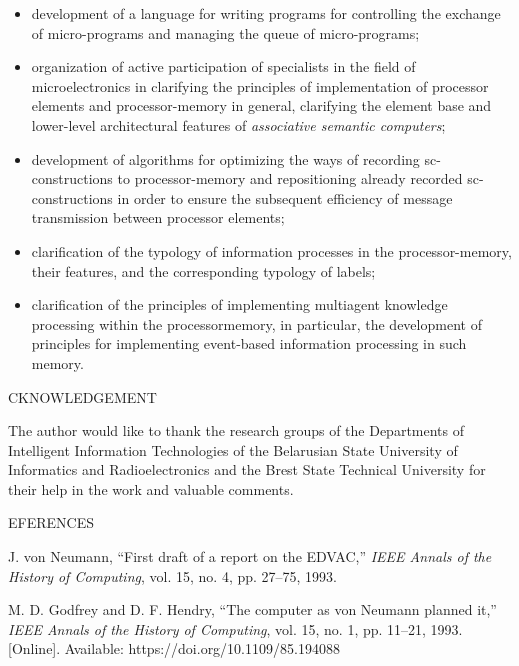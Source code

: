 \documentclass{article}
\begin{document}
{\begin{multicols}{2}
\begin{itemize}
    \item development of a language for writing programs
for controlling the exchange of micro-programs and
managing the queue of micro-programs;

    \item organization of active participation of specialists
in the field of microelectronics in clarifying the
principles of implementation of processor elements
and processor-memory in general, clarifying the
element base and lower-level architectural features
of \textit{associative semantic computers};
    \item development of algorithms for optimizing the ways
of recording sc-constructions to processor-memory
and repositioning already recorded sc-constructions
in order to ensure the subsequent efficiency of
message transmission between processor elements;
    \item clarification of the typology of information processes
in the processor-memory, their features, and the
corresponding typology of labels;
    \item clarification of the principles of implementing multiagent knowledge processing within the processormemory, in particular, the development of principles
for implementing event-based information processing
in such memory.
\end{itemize}

\begin{center}
    {\selectfont {\large A}CKNOWLEDGEMENT}
\end{center}


The author would like to thank the research groups of
the Departments of Intelligent Information Technologies
of the Belarusian State University of Informatics and
Radioelectronics and the Brest State Technical University
for their help in the work and valuable comments.

\begin{center}
    {\selectfont {\large R}EFERENCES}
    \vspace{-30pt}
\end{center}

{\footnotesize
\renewcommand\refname{}
\begin{thebibliography}{65}
    \item J. von Neumann, “First draft of a report on the EDVAC,” \textit{IEEE
Annals of the History of Computing}, vol. 15, no. 4, pp. 27–75,
1993.
    \item M. D. Godfrey and D. F. Hendry, “The computer as
von Neumann planned it,” \textit{IEEE Annals of the History of
Computing}, vol. 15, no. 1, pp. 11–21, 1993. [Online]. Available:
https://doi.org/10.1109/85.194088


\end{thebibliography}}
\end{multicols}}
\end{document}
